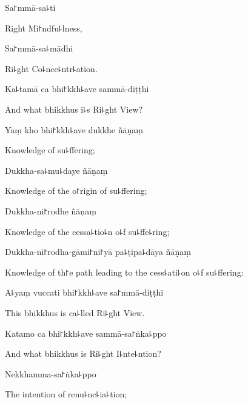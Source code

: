 Sa꜓mmā-sa꜕ti

\begin{english}
  Right Mi꜓ndfu꜕lness,
\end{english}

Sa꜓mmā-sa꜕mādhi

\begin{english}
  Ri꜕ght Co꜕nce꜕ntr꜕ation.
\end{english}

Ka꜕tamā ca bhi꜓kkh꜕ave sammā-diṭṭhi

\begin{english}
  And what bhikkhus i꜕s Ri꜕ght View?
\end{english}

Yaṃ kho bhi꜓kkh꜕ave dukkhe ñāṇaṃ

\begin{english}
  Knowledge of su꜕ffering;
\end{english}

Dukkha-sa꜕mu꜕daye ñāṇaṃ

\begin{english}
  Knowledge of the o꜓rigin of su꜕ffering;
\end{english}

Dukkha-ni꜓rodhe ñāṇaṃ

\begin{english}
  Knowledge of the cessa꜕tio꜕n o꜕f su꜕ffe꜕ring;
\end{english}

Dukkha-ni꜓rodha-gāmi꜓ni꜓yā pa꜕ṭipa꜕dāya ñāṇaṃ

\begin{english}
  Knowledge of th꜓e path leading to the cess꜕ati꜕on o꜕f su꜕ffering:
\end{english}

A꜕yaṃ vuccati bhi꜓kkh꜕ave sa꜓mmā-diṭṭhi

\begin{english}
  This bhikkhus is ca꜕lled Ri꜕ght View.
\end{english}

Katamo ca bhi꜓kkh꜕ave sammā-sa꜓ṅka꜕ppo

\begin{english}
  And what bhikkhus is Ri꜕ght I꜕nte꜕ntion?
\end{english}

Nekkhamma-sa꜓ṅka꜕ppo

\begin{english}
  The intention of renu꜕nc꜕ia꜕tion;
\end{english}

